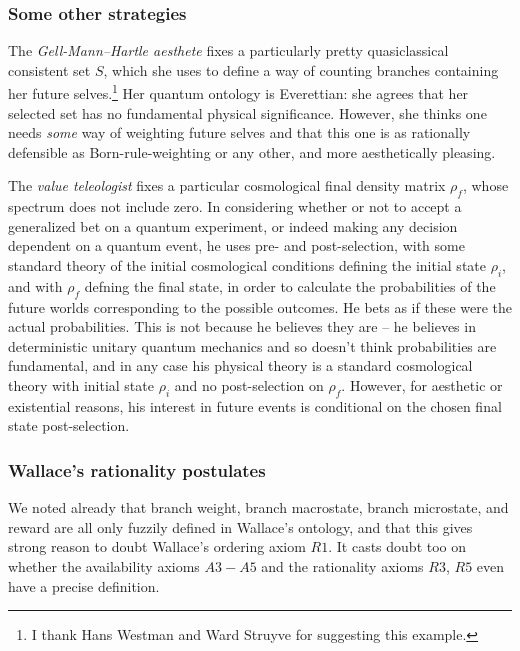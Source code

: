 \documentclass[aps,
pra,epsfig]{revtex4}
\begin{document}
\subsubsection{Some other strategies}

The {\it Gell-Mann--Hartle aesthete} fixes a particularly pretty 
quasiclassical consistent set $S$, which she uses to define a way 
of counting branches containing
her future selves.\footnote{I thank Hans Westman and Ward Struyve for
suggesting this example.}  Her quantum ontology is Everettian: she
agrees that her selected set has no fundamental physical significance.  
However, she thinks one needs {\it some} way of 
weighting future selves and that this one is as rationally
defensible as Born-rule-weighting or any other, and more aesthetically 
pleasing. 

The {\it value teleologist} fixes
a particular cosmological final density matrix $\rho_f$, whose
spectrum does not include zero.
In considering whether or not to accept a generalized bet on
a quantum experiment, or indeed making any decision dependent on a
quantum event, he uses pre- and post-selection, with some standard
theory of the initial cosmological conditions defining the initial
state $\rho_i$, and with $\rho_f$ defning the final state, in order to 
calculate the probabilities of the future worlds corresponding to the
possible outcomes.\cite{aharonovetal, gmhtwotime}  
He bets as if these were the actual probabilities.  This is not because 
he believes they are -- he believes in deterministic
unitary quantum mechanics and so doesn't think probabilities are
fundamental, and in any case
his physical theory is a standard cosmological theory with 
initial state $\rho_i$ and no post-selection on $\rho_f$.
However, for aesthetic or existential reasons, his interest in 
future events is conditional on the chosen final state post-selection.  

\subsubsection{Wallace's rationality postulates} 

We noted already that branch weight, branch macrostate, branch 
microstate, and reward are all only fuzzily defined in 
Wallace's ontology\cite{wallacevolone}, and that 
this gives strong reason to doubt Wallace's ordering axiom $R1$.   
It casts doubt too on whether the availability axioms $A3-A5$ and the 
rationality axioms $R3$, $R5$ even have a precise definition. 
\end{document}
